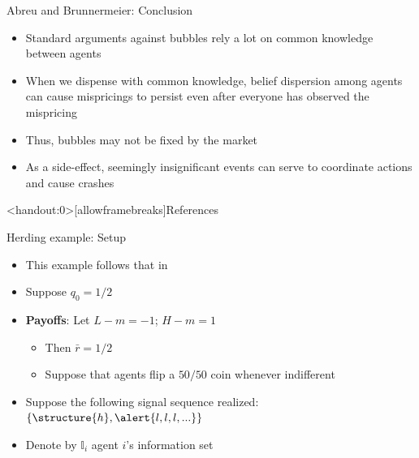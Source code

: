\documentclass[english,10pt
,aspectratio=169
]{beamer}
\begin{document}
\begin{frame}{Abreu and Brunnermeier: Conclusion}
	\begin{itemize}
		\item Standard arguments against bubbles rely a lot on common knowledge between agents
		\item When we dispense with common knowledge, belief dispersion among agents can cause mispricings to persist even after everyone has observed the mispricing
		\item Thus, bubbles may not be fixed by the market
		\item As a side-effect, seemingly insignificant events can serve to coordinate actions and cause crashes
	\end{itemize}
\end{frame}






\appendix
\begin{frame}<handout:0>[allowframebreaks]{References}
	
	
\end{frame}


\begin{frame}{Herding example: Setup} \label{EXP}
	\begin{itemize}
		\item This example follows that in \cite{bikhchandani_herd_2000}
		\item Suppose $q_0 = 1/2$
		\item \textbf{Payoffs}: Let $L-m = -1$; $H-m = 1$
		\begin{itemize}
			\item Then $\bar{r} = 1/2$
			\item Suppose that agents flip a $50/50$ coin whenever indifferent
		\end{itemize}
		\item Suppose the following signal sequence realized: $\{\structure{h},\alert{ l, l, l, ...}\}$
		\item Denote by $\mathbb{I}_i$ agent $i$'s information set
	\end{itemize}
\end{frame}
\end{document}
